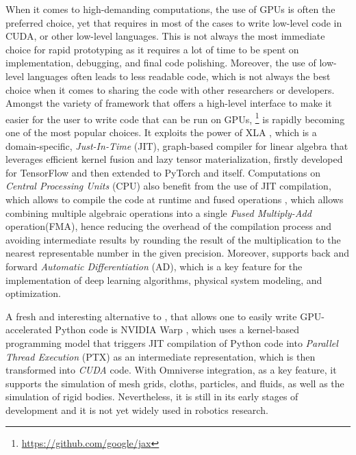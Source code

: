 When it comes to high-demanding computations, the use of \ac{GPU}s is often the preferred choice, yet that requires in most of the cases to write low-level code in \ac{CUDA}, \cpp or other low-level languages. This is not always the most immediate choice for rapid prototyping as it requires a lot of time to be spent on implementation, debugging, and final code polishing. Moreover, the use of low-level languages often leads to less readable code, which is not always the best choice when it comes to sharing the code with other researchers or developers. Amongst the variety of framework that offers a high-level interface to make it easier for the user to write code that can be run on \ac{GPU}s, \jax \footnote{\url{https://github.com/google/jax}} \citep{bradbury_jax_2018,47008} is rapidly becoming one of the most popular choices. It exploits the power of \ac{XLA} \citep{50530}, which is a domain-specific, \textit{Just-In-Time} (\ac{JIT}), graph-based compiler for linear algebra that leverages efficient kernel fusion and lazy tensor materialization, firstly developed for TensorFlow \citep{tensorflow2015-whitepaper} and then extended to PyTorch and \jax itself.
Computations on \textit{Central Processing Units} (\ac{CPU}) also benefit from the use of \ac{JIT} compilation, which allows to compile the code at runtime and fused operations \citep{wang_kernel_2010,snider_operator_2023}, which allows combining multiple algebraic operations into a single \textit{Fused Multiply-Add} operation(\ac{FMA}), hence reducing the overhead of the compilation process and avoiding intermediate results by rounding the result of the multiplication to the nearest representable number in the given precision.
Moreover, \jax supports back and forward \textit{Automatic Differentiation} (\ac{AD}), which is a key feature for the implementation of deep learning algorithms, physical system modeling, and optimization.

A fresh and interesting alternative to \jax, that allows one to easily write \ac{GPU}-accelerated Python code is NVIDIA Warp \citep{warp2022}, which uses a kernel-based programming model that triggers \ac{JIT} compilation of Python code into \textit{Parallel Thread Execution} (\ac{PTX}) as an intermediate representation, which is then transformed into \textit{CUDA} code. With Omniverse integration, as a key feature, it supports the simulation of mesh grids, cloths, particles, and fluids, as well as the simulation of rigid bodies. Nevertheless, it is still in its early stages of development and it is not yet widely used in robotics research.


